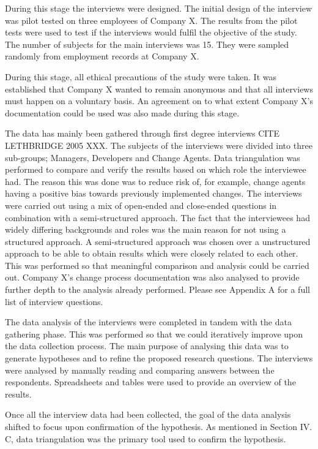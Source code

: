 \documentclass[times, 10pt,twocolumn]{Article}
\begin{document}
During this stage the interviews were designed. The initial design of the interview was pilot tested on three employees of Company X. The results from the pilot tests were used to test if the interviews would fulfil the objective of the study. The number of subjects for the main interviews was 15. They were sampled randomly from employment records at Company X. 

During this stage, all ethical precautions of the study were taken. It was established that Company X wanted to remain anonymous and that all interviews must happen on a voluntary basis. An agreement on to what extent Company X's documentation could be used was also made during this stage.

The data has mainly been gathered through first degree interviews CITE LETHBRIDGE 2005 XXX. The subjects of the interviews were divided into three sub-groups; Managers, Developers and Change Agents. Data triangulation was performed to compare and verify the results based on which role the interviewee had. The reason this was done was to reduce risk of, for example, change agents having a positive bias towards previously implemented changes. The interviews were carried out using a mix of open-ended and close-ended questions in combination with a semi-structured approach. The fact that the interviewees had widely differing backgrounds and roles was the main reason for not using a structured approach. A semi-structured approach was chosen over a unstructured approach to be able to obtain results which were closely related to each other. This was performed so that meaningful comparison and analysis could be carried out. Company X's change process documentation was also analysed to provide further depth to the analysis already performed. Please see Appendix A for a full list of interview questions.

The data analysis of the interviews were completed in tandem with the data gathering phase. This was performed so that we could iteratively improve upon the data collection process. The main purpose of analysing this data was to generate hypotheses and to refine the proposed research questions. The interviews were analysed by manually reading and comparing answers between the respondents. Spreadsheets and tables were used to provide an overview of the results. 

Once all the interview data had been collected, the goal of the data analysis shifted to focus upon confirmation of the hypothesis. As mentioned in Section IV. C, data triangulation was the primary tool used to confirm the hypothesis. 
\end{document}

